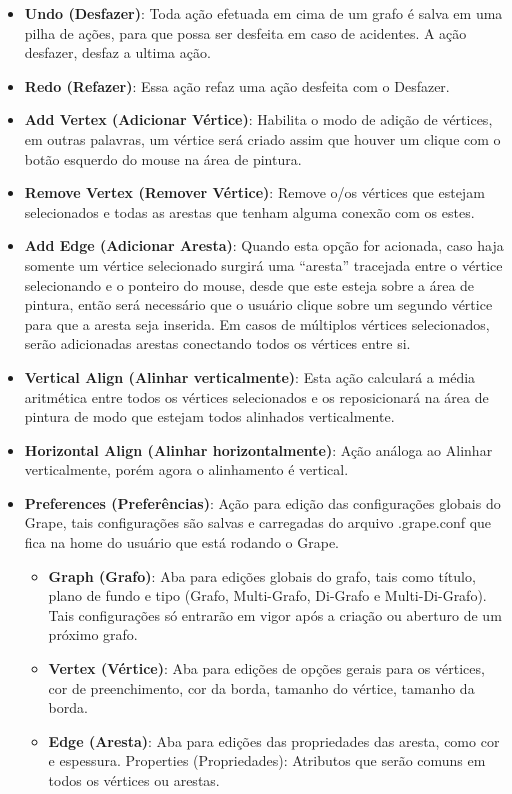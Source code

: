 \documentclass[a4paper]{abnt}
\begin{document}
\begin{itemize}
    \item \textbf{Undo (Desfazer)}: Toda ação efetuada em cima de um grafo é salva em uma pilha de ações, para que possa ser desfeita em caso de acidentes. A ação desfazer, desfaz a ultima ação.
    \item \textbf{Redo (Refazer)}: Essa ação refaz uma ação desfeita com o Desfazer.
    \item \textbf{Add Vertex (Adicionar Vértice)}: Habilita o modo de adição de vértices, em outras palavras, um vértice será criado assim que houver um clique com o botão esquerdo do mouse na área de pintura.
    \item \textbf{Remove Vertex (Remover Vértice)}: Remove o/os vértices que estejam selecionados e todas as arestas que tenham alguma conexão com os estes.
    \item \textbf{Add Edge (Adicionar Aresta)}: Quando esta opção for acionada, caso haja somente um vértice selecionado surgirá uma “aresta” tracejada entre o vértice selecionando e o ponteiro do mouse, desde que este esteja sobre a área de pintura, então será necessário que o usuário clique sobre um segundo vértice para que a aresta seja inserida. Em casos de múltiplos vértices selecionados, serão adicionadas arestas conectando todos os vértices entre si.
    \item \textbf{Vertical Align (Alinhar verticalmente)}: Esta ação calculará a média aritmética entre todos os vértices selecionados e os reposicionará na área de pintura de modo que estejam todos alinhados verticalmente.
    \item \textbf{Horizontal Align (Alinhar horizontalmente)}: Ação análoga ao Alinhar verticalmente, porém agora o alinhamento é vertical.
    \item \textbf{Preferences (Preferências)}: Ação para edição das configurações globais do Grape, tais configurações são salvas e carregadas do arquivo .grape.conf que fica na home do usuário que está rodando o Grape.
    \begin{itemize}
        \item \textbf{Graph (Grafo)}: Aba para edições globais do grafo, tais como título, plano de fundo e tipo (Grafo, Multi-Grafo, Di-Grafo e Multi-Di-Grafo). Tais configurações só entrarão em vigor após a criação ou aberturo de um próximo grafo.
        \item \textbf{Vertex (Vértice)}: Aba para edições de opções gerais para os vértices, cor de preenchimento, cor da borda, tamanho do vértice, tamanho da borda.
        \item \textbf{Edge (Aresta)}: Aba para edições das propriedades das aresta, como cor e espessura.
        Properties (Propriedades): Atributos que serão comuns em todos os vértices ou arestas.
    \end{itemize}
\end{itemize}
\end{document}
